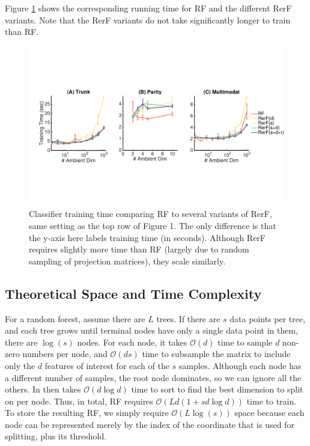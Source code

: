 \documentclass{article} %
\providecommand{\mc}[1]{\mathcal{#1}}
\begin{document}
Figure \ref{fig:time} shows the corresponding running time for RF and the different RerF variants.  Note that the RerF variants do not take significantly longer to train than RF.  



\begin{figure}[h]
\begin{center}
\includegraphics[trim=0in 3in 0in 3in, clip=true, width=\linewidth]{../Figures/pdf/Fig2_Time}
\end{center}
\caption{Classifier training time comparing RF to several variants of RerF, same setting as the top row of Figure 1. The only difference is that the y-axis here labels training time (in seconds). Although RerF requires slightly more time than RF (largely due to random sampling of projection matrices), they scale similarly.}
\label{fig:time}
\end{figure}

\subsection{Theoretical Space and Time Complexity}

For a random forest, assume there are $L$ trees.  
If there are $s$ data points per tree, and each tree grows until terminal nodes have only a single data point in them, there are $\log(s)$ nodes.
For each node, it takes $\mc{O}(d)$ time to sample $d$ non-zero numbers per node,
and $\mc{O}(d s)$ time to subsample the matrix to include only the $d$ features of interest for each of the $s$ samples.   
Although each node has a different number of samples, the root node dominates, so we can ignore all the others.
In then takes $\mc{O}(d \log d)$ time to sort to find the best dimension to split on per node.  
Thus, in total, RF requires $\mc{O}(Ld  (1 + s d\log d))$ time to train. To store the resulting RF, we simply require $\mc{O}(L \log(s))$ space because each node can be represented merely by the index of the coordinate that is used for splitting, plus its threshold.
\end{document}
